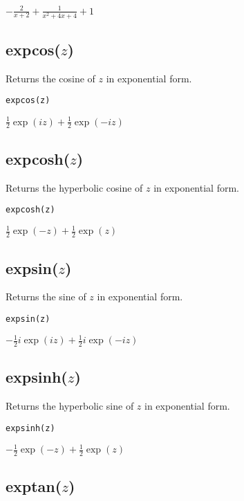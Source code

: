\noindent
$\displaystyle -\frac{2}{x+2}+\frac{1}{x^2+4x+4}+1$

\subsection*{expcos($z$)}

Returns the cosine of $z$ in exponential form.

{\color{blue}
\begin{verbatim}
expcos(z)
\end{verbatim}
}

\noindent
$\displaystyle \tfrac{1}{2}\exp(iz)+\tfrac{1}{2}\exp(-iz)$

\subsection*{expcosh($z$)}

Returns the hyperbolic cosine of $z$ in exponential form.

{\color{blue}
\begin{verbatim}
expcosh(z)
\end{verbatim}
}

\noindent
$\displaystyle \tfrac{1}{2}\exp(-z)+\tfrac{1}{2}\exp(z)$

\subsection*{expsin($z$)}

Returns the sine of $z$ in exponential form.

{\color{blue}
\begin{verbatim}
expsin(z)
\end{verbatim}
}

\noindent
$\displaystyle -\tfrac{1}{2}i\exp(iz)+\tfrac{1}{2}i\exp(-iz)$

\subsection*{expsinh($z$)}

Returns the hyperbolic sine of $z$ in exponential form.

{\color{blue}
\begin{verbatim}
expsinh(z)
\end{verbatim}
}

\noindent
$\displaystyle -\tfrac{1}{2}\exp(-z)+\tfrac{1}{2}\exp(z)$

\subsection*{exptan($z$)}

